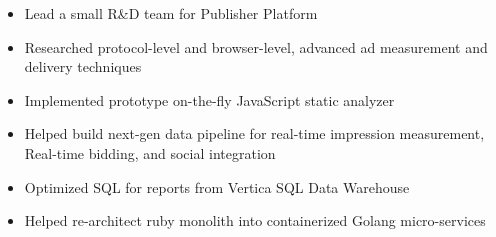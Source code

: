\documentclass[10pt,a4paper,ragged2e]{altacv}
\begin{document}
\divider

\begin{itemize}
\item Lead a small R\&D team for Publisher Platform
\item Researched protocol-level and browser-level, advanced ad measurement and delivery techniques
\item Implemented prototype on-the-fly JavaScript static analyzer
\item Helped build next-gen data pipeline for real-time impression measurement, Real-time bidding, and social integration
\item Optimized SQL for reports from Vertica SQL Data Warehouse
\end{itemize}

\divider

\begin{itemize}
\item Helped re-architect ruby monolith into containerized Golang micro-services
\end{itemize}


%
\end{document}
